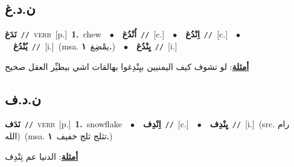 \documentclass[10pt,a4paper,twoside]{article} %
\begin{document}
\begin{multicols}{2}
\vspace{-3mm}
\subsection*{\color{blue}\foreignlanguage{arabic}{ن.د.غ}\color{blue}{}} 

{\setlength\topsep{0pt}\textbf{\foreignlanguage{arabic}{نَدَغ}}\ {\color{gray}\texttt{//}\color{black}}\ \textsc{verb}\ [p.]\ \textbf{1.}~chew\ \ $\bullet$\ \ \setlength\topsep{0pt}\textbf{\foreignlanguage{arabic}{اُنْدُغ}}\ {\color{gray}\texttt{//}\color{black}}\ [c.]\ \ $\bullet$\ \ \setlength\topsep{0pt}\textbf{\foreignlanguage{arabic}{اِنْدُغ}}\ {\color{gray}\texttt{//}\color{black}}\ [c.]\ \ $\bullet$\ \ \setlength\topsep{0pt}\textbf{\foreignlanguage{arabic}{يُنْدُغ}}\ {\color{gray}\texttt{//}\color{black}}\ [i.]\ \color{gray}(msa. \foreignlanguage{arabic}{يمْضِغ}~\foreignlanguage{arabic}{\textbf{١.}})\color{black}\ \ $\bullet$\ \ \setlength\topsep{0pt}\textbf{\foreignlanguage{arabic}{يِنْدُغ}}\ {\color{gray}\texttt{//}\color{black}}\ [i.]\  \begin{flushright}\color{gray}\foreignlanguage{arabic}{\textbf{\underline{\foreignlanguage{arabic}{أمثلة}}}: لو تشوف كيف اليمنيين بيِنْدِغوا بهالقات اشي بيطيِّر العقل صحيح}\end{flushright}\color{black}} \vspace{2mm}

\vspace{-3mm}
\subsection*{\color{blue}\foreignlanguage{arabic}{ن.د.ف}\color{blue}{}} 

{\setlength\topsep{0pt}\textbf{\foreignlanguage{arabic}{نَدَف}}\ {\color{gray}\texttt{//}\color{black}}\ \textsc{verb}\ [p.]\ \textbf{1.}~snowflake\ \ $\bullet$\ \ \setlength\topsep{0pt}\textbf{\foreignlanguage{arabic}{اِنْدِف}}\ {\color{gray}\texttt{//}\color{black}}\ [c.]\ \ $\bullet$\ \ \setlength\topsep{0pt}\textbf{\foreignlanguage{arabic}{يِنْدِف}}\ {\color{gray}\texttt{//}\color{black}}\ [i.]\ (src. \color{gray}\foreignlanguage{arabic}{رام الله}\color{black})\ \color{gray}(msa. \foreignlanguage{arabic}{تثلج ثلج خفيف}~\foreignlanguage{arabic}{\textbf{١.}})\color{black}\  \begin{flushright}\color{gray}\foreignlanguage{arabic}{\textbf{\underline{\foreignlanguage{arabic}{أمثلة}}}: الدنيا عم تِنْدِف}\end{flushright}\color{black}} \vspace{2mm}


\end{multicols}
\end{document}
